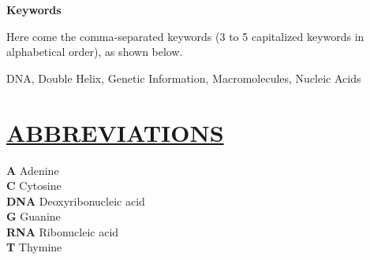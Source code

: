 \documentclass{article}
\begin{document}
{{{{{{{\noindent\textbf{Keywords}

\bigskip

\noindent Here come the comma-separated keywords (3 to 5 capitalized keywords in alphabetical order), as shown below.

\bigskip

\noindent DNA, Double Helix, Genetic Information, Macromolecules, Nucleic Acids
\pagebreak

\section*{\uline{ABBREVIATIONS}}
\textbf{A}  \hspace{1cm}  Adenine \\

\bigskip
\noindent \textbf{C} \hspace{1cm}  Cytosine \\

\bigskip
\noindent \textbf{DNA} \hspace{0.4cm}  Deoxyribonucleic acid\\

\bigskip
\noindent \textbf{G} \hspace{1cm}  Guanine\\

\bigskip
\noindent \textbf{RNA} \hspace{0.4cm}  Ribonucleic acid\\

\bigskip
\noindent \textbf{T} \hspace{1cm}  Thymine\\
\pagebreak


}}}}}}}
\end{document}
